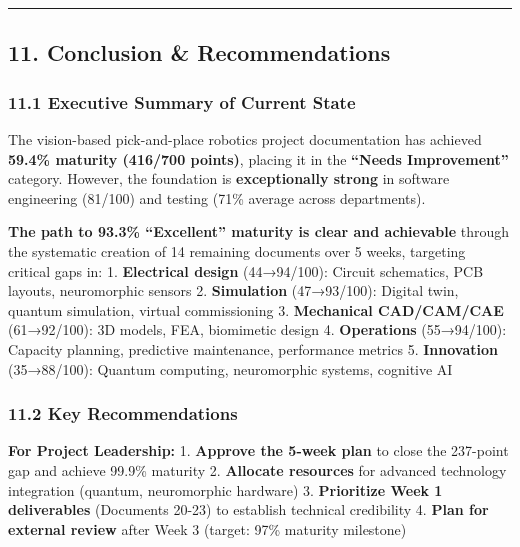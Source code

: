 \documentclass[
]{article}
\begin{document}
\begin{center}\rule{0.5\linewidth}{0.5pt}\end{center}

\hypertarget{conclusion-recommendations}{%
\subsection{11. Conclusion \&
Recommendations}\label{conclusion-recommendations}}

\hypertarget{executive-summary-of-current-state}{%
\subsubsection{11.1 Executive Summary of Current
State}\label{executive-summary-of-current-state}}

The vision-based pick-and-place robotics project documentation has
achieved \textbf{59.4\% maturity (416/700 points)}, placing it in the
\textbf{``Needs Improvement''} category. However, the foundation is
\textbf{exceptionally strong} in software engineering (81/100) and
testing (71\% average across departments).

\textbf{The path to 93.3\% ``Excellent'' maturity is clear and
achievable} through the systematic creation of 14 remaining documents
over 5 weeks, targeting critical gaps in: 1. \textbf{Electrical design}
(44→94/100): Circuit schematics, PCB layouts, neuromorphic sensors 2.
\textbf{Simulation} (47→93/100): Digital twin, quantum simulation,
virtual commissioning 3. \textbf{Mechanical CAD/CAM/CAE} (61→92/100): 3D
models, FEA, biomimetic design 4. \textbf{Operations} (55→94/100):
Capacity planning, predictive maintenance, performance metrics 5.
\textbf{Innovation} (35→88/100): Quantum computing, neuromorphic
systems, cognitive AI

\hypertarget{key-recommendations}{%
\subsubsection{11.2 Key Recommendations}\label{key-recommendations}}

\textbf{For Project Leadership:} 1. \textbf{Approve the 5-week plan} to
close the 237-point gap and achieve 99.9\% maturity 2. \textbf{Allocate
resources} for advanced technology integration (quantum, neuromorphic
hardware) 3. \textbf{Prioritize Week 1 deliverables} (Documents 20-23)
to establish technical credibility 4. \textbf{Plan for external review}
after Week 3 (target: 97\% maturity milestone)
\end{document}
